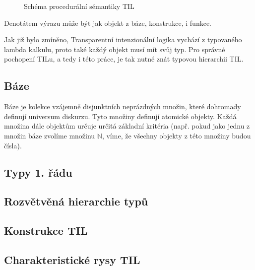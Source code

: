 \begin{figure}
    \centering
    \caption{Schéma procedurální sémantiky TIL}
    \label{fig:til-semantics}
\end{figure}

Denotátem výrazu může být jak objekt z báze, konstrukce, i funkce.

Jak již bylo zmíněno, Transparentní intenzionální logika vychází z typovaného lambda kalkulu, proto
také každý objekt musí mít svůj typ. Pro správné pochopení TILu, a tedy i této práce, je tak nutné 
znát typovou hierarchii TIL.

\subsection{Báze}

Báze je kolekce vzájemně disjunktních neprázdných množin, které dohromady definují universum
diskurzu. Tyto množiny definují atomické objekty. Každá množina dále objektům určuje určitá
základní kritéria (např. pokud jako jednu z množin báze zvolíme množinu $\mathbb{N}$, víme, že
všechny objekty z této množiny budou čísla).

\subsection{Typy 1. řádu}


\subsection{Rozvětvěná hierarchie typů}

\subsection{Konstrukce TIL}

\subsection{Charakteristické rysy TIL}

\endinput
